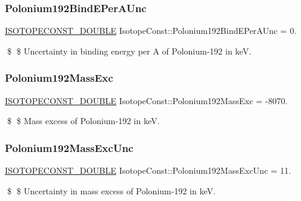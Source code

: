 \subsubsection{\texorpdfstring{Polonium192\+Bind\+E\+Per\+A\+Unc}{Polonium192BindEPerAUnc}}
{\footnotesize\ttfamily \mbox{\hyperlink{group___isotope_const-_macros_ga8f45a7272ce02c0b4c65c44636ed719a}{I\+S\+O\+T\+O\+P\+E\+C\+O\+N\+S\+T\+\_\+\+D\+O\+U\+B\+LE}} Isotope\+Const\+::\+Polonium192\+Bind\+E\+Per\+A\+Unc = 0.}

\$ \$ Uncertainty in binding energy per A of Polonium-\/192 in keV. \mbox{\label{group___isotope_const-_polonium-_po192_ga1db1470a15fe489060b607dfbeaf7432}} 
\subsubsection{\texorpdfstring{Polonium192\+Mass\+Exc}{Polonium192MassExc}}
{\footnotesize\ttfamily \mbox{\hyperlink{group___isotope_const-_macros_ga8f45a7272ce02c0b4c65c44636ed719a}{I\+S\+O\+T\+O\+P\+E\+C\+O\+N\+S\+T\+\_\+\+D\+O\+U\+B\+LE}} Isotope\+Const\+::\+Polonium192\+Mass\+Exc = -\/8070.}

\$ \$ Mass excess of Polonium-\/192 in keV. \mbox{\label{group___isotope_const-_polonium-_po192_gaba8f2eac47a0defc93b953c6544805c7}} 
\subsubsection{\texorpdfstring{Polonium192\+Mass\+Exc\+Unc}{Polonium192MassExcUnc}}
{\footnotesize\ttfamily \mbox{\hyperlink{group___isotope_const-_macros_ga8f45a7272ce02c0b4c65c44636ed719a}{I\+S\+O\+T\+O\+P\+E\+C\+O\+N\+S\+T\+\_\+\+D\+O\+U\+B\+LE}} Isotope\+Const\+::\+Polonium192\+Mass\+Exc\+Unc = 11.}

\$ \$ Uncertainty in mass excess of Polonium-\/192 in keV. \mbox{\label{group___isotope_const-_polonium-_po192_ga8487d35c95613da8a144673ae6c28f2a}} 
